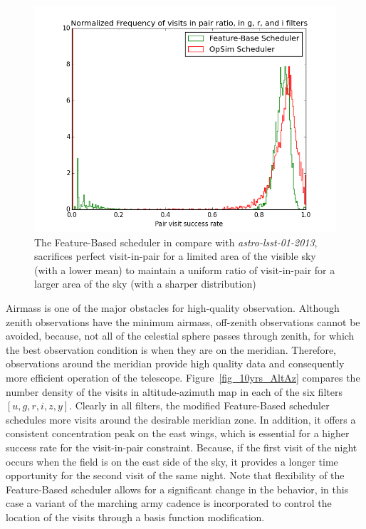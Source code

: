 \documentclass[12pt]{aastex62}
\theoremstyle{definition}
\begin{document}
\begin{figure}[h!]
\centering
\includegraphics[width=.5\linewidth]{Figures/PairHist.png}
\caption{The Feature-Based scheduler in compare with \textit{astro-lsst-01-2013}, sacrifices perfect visit-in-pair for a limited area of the visible sky (with a lower mean) to maintain a uniform ratio of visit-in-pair for a larger area of the sky (with a sharper distribution)}
\label{fig_10yrs_pair_hist}
\end{figure}

Airmass is one of the major obstacles for high-quality observation. Although zenith observations have the minimum airmass, off-zenith observations cannot be avoided, because, not all of the celestial sphere passes through zenith, for which the best observation condition is when they are on the meridian. Therefore, observations around the meridian provide high quality data and consequently more efficient operation of the telescope. Figure~\ref{fig_10yrs_AltAz} compares the number density of the visits in altitude-azimuth map in each of the six filters $[u,g,r,i,z,y]$. Clearly in all filters, the modified Feature-Based scheduler schedules more visits around the desirable meridian zone. In addition, it offers a consistent concentration peak on the east wings, which is essential for a higher success rate for the visit-in-pair constraint. Because, if the first visit of the night occurs when the field is on the east side of the sky, it provides a longer time opportunity for the second visit of the same night. Note that flexibility of the Feature-Based scheduler allows for a significant change in the behavior, in this case a variant of the marching army cadence is incorporated to control the location of the visits through a basis function modification.
\end{document}
